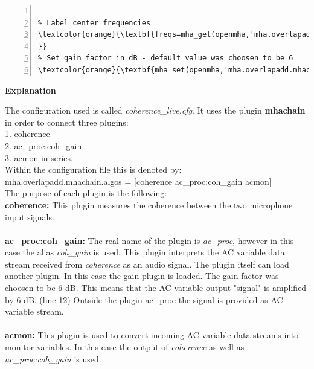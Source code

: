 \documentclass[11pt,a4paper,twoside]{article}
\newcommand{\+}{\discretionary{\mbox{\scriptsize$\hookleftarrow$}}{}{}}
\begin{document}
{{\begin{enumerate}
\begin{Verbatim}[numbers=left,commandchars=\\\{\}]
%% Label center frequencies and set gain factor of ac_proc

% Label center frequencies
\textcolor{orange}{\textbf{freqs=mha_get(openmha,'mha.overlapadd.mhachain.coherence.cf'); 
}} 
% Set gain factor in dB - default value was choosen to be 6
\textcolor{orange}{\textbf{mha_set(openmha,'mha.overlapadd.mhachain.coh_gain.gain.gains',6);}}
\end{Verbatim} 



\newpage

\textbf{Explanation}

The configuration used is called \textit{coherence\_live.cfg}. It uses the plugin \textbf{mhachain} in order to connect three plugins: \\
1. coherence \\
2. ac\_proc:coh\_gain \\
3. acmon in series. \\
Within the configuration file this is denoted by: \\

{\ttfamily mha.overlapadd.mhachain.algos = [coherence ac\_proc:coh\_gain acmon]} \\



 The purpose of each plugin is the following: \\

\textbf{coherence:} This plugin measures the coherence between the two microphone input signals. \\ \\
\textbf{ac\_proc:coh\_gain:} The real name of the plugin is \textit{ac\_proc}, however in this case the alias \textit{coh\_gain} is used. This plugin interprets the AC variable data stream received from \textit{coherence} as an audio signal. The plugin itself can load another plugin. In this case the gain plugin is loaded. The gain factor was choosen to be 6 dB. This means that the AC variable output "signal" is amplified by 6 dB. (line 12) Outside the plugin ac\_proc the signal is provided as AC variable stream.\\ \\
\textbf{acmon:} This plugin is used to convert incoming AC variable data streams into monitor variables. In this case the output of \textit{coherence} as well as \textit{ac\_proc:coh\_gain} is used.


\end{enumerate}}}
\end{document}
